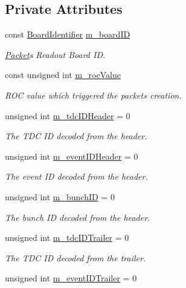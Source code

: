 \subsection*{Private Attributes}
\begin{DoxyCompactItemize}
\item 
const \hyperlink{class_board_identifier}{Board\+Identifier} \hyperlink{class_packet_a5e2c2ee20b510c10fc69d8045809a00e}{m\+\_\+board\+ID}
\begin{DoxyCompactList}\small\item\em \hyperlink{class_packet}{Packet}\textquotesingle{}s Readout Board ID. \end{DoxyCompactList}\item 
const unsigned int \hyperlink{class_packet_ac4587a52a089f8fa1b7a899e4b46cb7d}{m\+\_\+roc\+Value}
\begin{DoxyCompactList}\small\item\em R\+OC value which triggered the packet\textquotesingle{}s creation. \end{DoxyCompactList}\item 
unsigned int \hyperlink{class_packet_a0f39ba4b6d5a8732381c1bcbbeeb7eb9}{m\+\_\+tdc\+I\+D\+Header} = 0
\begin{DoxyCompactList}\small\item\em The T\+DC ID decoded from the header. \end{DoxyCompactList}\item 
unsigned int \hyperlink{class_packet_a3abf93570be0669506f39b391bc574ca}{m\+\_\+event\+I\+D\+Header} = 0
\begin{DoxyCompactList}\small\item\em The event ID decoded from the header. \end{DoxyCompactList}\item 
unsigned int \hyperlink{class_packet_ad0a2dce379a45ee0f899d495f5e760fc}{m\+\_\+bunch\+ID} = 0
\begin{DoxyCompactList}\small\item\em The bunch ID decoded from the header. \end{DoxyCompactList}\item 
unsigned int \hyperlink{class_packet_aad739524a3b965eef89c827339b2e1f2}{m\+\_\+tdc\+I\+D\+Trailer} = 0
\begin{DoxyCompactList}\small\item\em The T\+DC ID decoded from the trailer. \end{DoxyCompactList}\item 
unsigned int \hyperlink{class_packet_ae32fc3c9665b68f00dabd9327d4c84c6}{m\+\_\+event\+I\+D\+Trailer} = 0

\end{DoxyCompactItemize}
